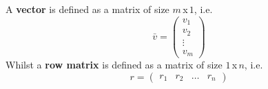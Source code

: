 \documentclass[diffeq.tex]{subfiles}
\begin{document}
    \begin{definition}
        A \textbf{vector} is defined as a matrix of size $m$\,x\,$1$, i.e.
        \begin{equation}
            \bar{v} = \begin{pmatrix}
                v_{1}\\
                v_{2}\\
                \vdots\\
                v_{m}
            \end{pmatrix}
        \end{equation}
        Whilst a \textbf{row matrix} is defined as a matrix of size $1$\,x\,$n$, i.e.
        \begin{equation}
            r = \begin{pmatrix}
                r_{1} & r_{2} & \dots & r_{n}
            \end{pmatrix}
        \end{equation}
    \end{definition}
    \np
\end{document}
